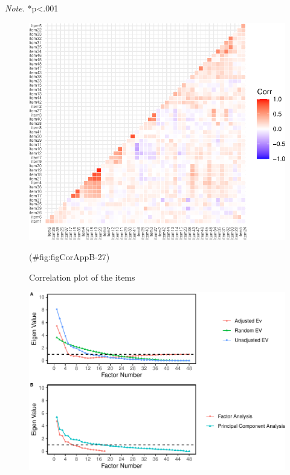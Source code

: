\begin{appendix}
\begin{table}[h]
\begin{center}
\begin{threeparttable}
\begin{tablenotes}[para]
\normalsize{\textit{Note.} *p<.001}
\end{tablenotes}

\end{threeparttable}
\end{center}

\end{table}

\begin{figure}

{\centering \includegraphics[width=1\linewidth]{manuscript_files/figure-latex/figCorAppB-27-1} 

}

\caption{Correlation plot of the items}(\#fig:figCorAppB-27)
\end{figure}

\begin{figure}

{\centering \includegraphics[width=1\linewidth,height=1\textheight]{manuscript_files/figure-latex/facIdFigAppB-31-1} 

}
\end{figure}
\end{appendix}
